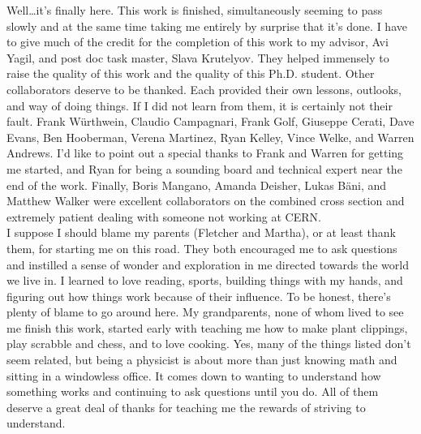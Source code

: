 \begin{frontmatter}
\begin{acknowledgements}                                                       
Well\ldots it's finally here. This work is finished, simultaneously seeming to pass slowly and at the same time taking me entirely by surprise that it's done. I have to give much of the credit for the completion of this work to my advisor, Avi Yagil, and post doc task master, Slava Krutelyov. They helped immensely to raise the quality of this work and the quality of this Ph.D. student. Other collaborators deserve to be thanked. Each provided their own lessons, outlooks, and way of doing things. If I did not learn from them, it is certainly not their fault. Frank W\"urthwein, Claudio Campagnari, Frank Golf, Giuseppe Cerati, Dave Evans, Ben Hooberman, Verena Martinez, Ryan Kelley, Vince Welke, and Warren Andrews.  I'd like to point out a special thanks to Frank and Warren for getting me started, and Ryan for being a sounding board and technical expert near the end of the work. Finally, Boris Mangano, Amanda Deisher, Lukas B\"ani, and Matthew Walker were excellent collaborators on the combined cross section and extremely patient dealing with someone not working at CERN. \\

I suppose I should blame my parents (Fletcher and Martha), or at least thank them, for starting me on this road. They both encouraged me to ask questions and instilled a sense of wonder and exploration in me directed towards the world we live in. I learned to love reading, sports, building things with my hands, and figuring out how things work because of their influence. To be honest, there's plenty of blame to go around here. My grandparents, none of whom lived to see me finish this work, started early with teaching me how to make plant clippings, play scrabble and chess, and to love cooking. Yes, many of the things listed don't seem related, but being a physicist is about more than just knowing math and sitting in a windowless office. It comes down to wanting to understand how something works and continuing to ask questions until you do. All of them deserve a great deal of thanks for teaching me the rewards of striving to understand.\\


\end{acknowledgements}
\end{frontmatter}
